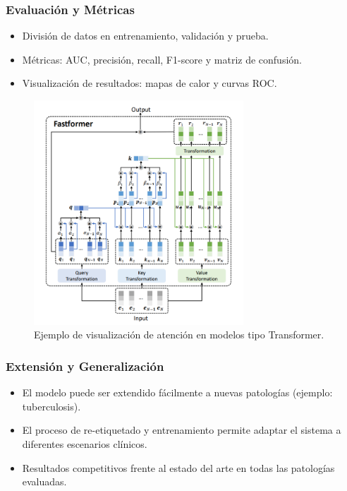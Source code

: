 \begin{frame}
\frametitle{Evaluación y Métricas}
\begin{itemize}
    \item División de datos en entrenamiento, validación y prueba.
    \item Métricas: AUC, precisión, recall, F1-score y matriz de confusión.
    \item Visualización de resultados: mapas de calor y curvas ROC.
\end{itemize}
\begin{figure}[ht!]
    \centering
    \includegraphics[width=0.7\textwidth]{../Chapters/2. Transformer/Figures/transformer/fastformer.png}
    \caption{Ejemplo de visualización de atención en modelos tipo Transformer.}
\end{figure}
\end{frame}

\begin{frame}
\frametitle{Extensión y Generalización}
\begin{itemize}
    \item El modelo puede ser extendido fácilmente a nuevas patologías (ejemplo: tuberculosis).
    \item El proceso de re-etiquetado y entrenamiento permite adaptar el sistema a diferentes escenarios clínicos.
    \item Resultados competitivos frente al estado del arte en todas las patologías evaluadas.
\end{itemize}
\end{frame}
